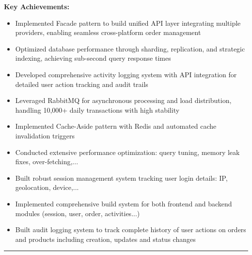 \documentclass[letterpaper,11pt]{article}
\newcommand{\resumeItem}[1]{
  \item\small{
  {#1 \vspace{-2pt}}
  }
}
\begin{document}
\resumeItem{\textbf{Key Achievements:}}
\begin{itemize}
\item Implemented Facade pattern to build unified API layer integrating multiple providers, enabling seamless cross-platform order management
\item Optimized database performance through sharding, replication, and strategic indexing, achieving sub-second query response times
\item Developed comprehensive activity logging system with API integration for detailed user action tracking and audit trails
\item Leveraged RabbitMQ for asynchronous processing and load distribution, handling 10,000+ daily transactions with high stability
\item Implemented Cache-Aside pattern with Redis and automated cache invalidation triggers
\item Conducted extensive performance optimization: query tuning, memory leak fixes, over-fetching,...
\item Built robust session management system tracking user login details: IP, geolocation, device,...
\item Implemented comprehensive build system for both frontend and backend modules (session, user, order, activities...)
\item Built audit logging system to track complete history of user actions on orders and products including creation, updates and status changes
\end{itemize}
\vspace{12pt}

\begin{center}
\textcolor{lightgray}{\rule[0pt]{0.5\textwidth}{0.03pt}}
\end{center}
\vspace{12pt}
\end{document}
